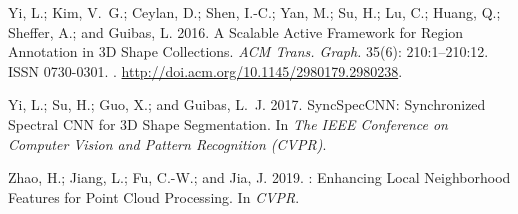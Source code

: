 \documentclass[letterpaper]{article} \usepackage{aaai21}  \usepackage{times}  \usepackage{helvet} \usepackage{courier}  \usepackage[hyphens]{url}  \usepackage{graphicx} \urlstyle{rm} \def\UrlFont{\rm}  \usepackage{natbib}  \usepackage{caption} \frenchspacing  \setlength{\pdfpagewidth}{8.5in}  \setlength{\pdfpageheight}{11in}  \usepackage{color}
\begin{document}
{\begin{thebibliography}{38}
Yi, L.; Kim, V.~G.; Ceylan, D.; Shen, I.-C.; Yan, M.; Su, H.; Lu, C.; Huang,
  Q.; Sheffer, A.; and Guibas, L. 2016.
\newblock A Scalable Active Framework for Region Annotation in 3D Shape
  Collections.
\newblock \emph{ACM Trans. Graph.} 35(6): 210:1--210:12.
\newblock ISSN 0730-0301.
\newblock {}.
\newblock \urlprefix\url{http://doi.acm.org/10.1145/2980179.2980238}.

Yi, L.; Su, H.; Guo, X.; and Guibas, L.~J. 2017.
\newblock SyncSpecCNN: Synchronized Spectral CNN for 3D Shape Segmentation.
\newblock In \emph{The IEEE Conference on Computer Vision and Pattern
  Recognition (CVPR)}.

Zhao, H.; Jiang, L.; Fu, C.-W.; and Jia, J. 2019.
: Enhancing Local Neighborhood Features for Point Cloud
  Processing.
\newblock In \emph{CVPR}.

\end{thebibliography}
 }
\end{document}
